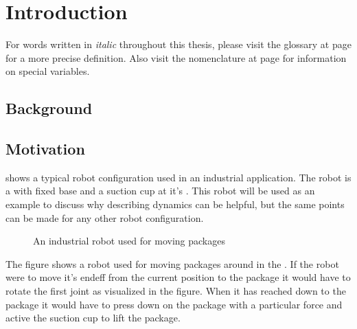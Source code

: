 \chapter{Introduction}

For words written in \textit{italic} throughout this thesis, please visit the glossary at page \pageref{glossary} for a more precise definition. Also visit the nomenclature at page \pageref{nomenclature} for information on special variables.

\section{Background}


\section{Motivation}

 shows a typical robot configuration used in an industrial application. The robot is a  with fixed base and a suction cup at it's . This robot will be used as an example to discuss why describing dynamics can be helpful, but the same points can be made for any other robot configuration.

\begin{figure}[h!]    
    \centering           
    \def\svgwidth{.8\columnwidth}
    
    \caption{An industrial robot used for moving packages}
    \label{exampleCase}
\end{figure}

The figure shows a robot used for moving packages around in the . If the robot were to move it's \gls{endeff} from the current position to the package it would have to rotate the first joint as visualized in the figure. When it has reached down to the package it would have to press down on the package with a particular force and active the suction cup to lift the package.

